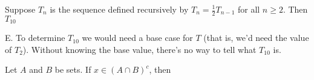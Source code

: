 \documentclass[addpoints]{exam}
\begin{document}
\begin{questions}
\question[2] Suppose $T_n$ is the sequence defined recursively by $T_n = \frac{1}{2} T_{n-1}$ for all $n \geq 2$. Then $T_{10}$

\begin{solution}
	E. To determine $T_{10}$ we would need a base case for $T$ (that is, we'd need the value of $T_2$). Without knowing the base value, there's no way to tell what $T_{10}$ is. 
\end{solution}


\question[2] Let $A$ and $B$ be sets. If $x \in (A \cap B)^c$, then 
	

\end{questions}
\end{document}
